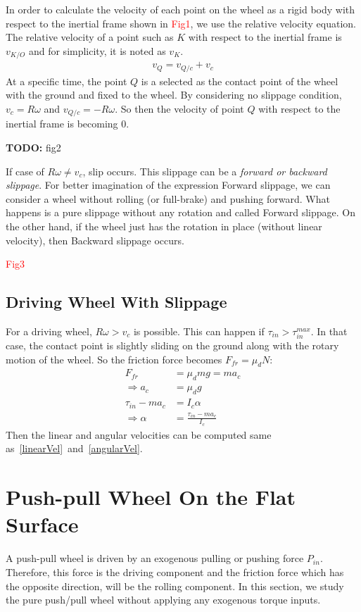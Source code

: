 \documentclass[letterpaper, 10pt, conference]{ieeeconf}
\newcommand{\TODO}[1]{{\color{red} {\bf TODO:} {#1}}}
\begin{document}
In order to calculate the velocity of each point on the wheel as a rigid body with respect to the inertial frame shown in \textcolor{red}{Fig1}, we use the relative velocity equation. The relative velocity of a point such as $K$ with respect to the inertial frame is $v_{K/O}$ and for simplicity, it is noted as $v_K$.
\begin{align}
v_Q = v_{Q/c} + v_c
\end{align}
At a specific time, the point $Q$ is a selected as the contact point of the wheel with the ground and fixed to the wheel. By considering no slippage condition, $v_c = R\omega$ and $v_{Q/c} = -R\omega$. So then the velocity of point $Q$ with respect to the inertial frame is becoming $0$.

\TODO{fig2}

If case of $R\omega \neq v_c$, slip occurs. This slippage can be a \emph{forward or backward slippage}. For better imagination of the expression Forward slippage, we can consider a wheel without rolling (or full-brake) and pushing forward. What happens is a pure slippage without any rotation and called Forward slippage. On the other hand, if the wheel just has the rotation in place (without linear velocity), then Backward slippage occurs.

\textcolor{red}{Fig3}
\subsection{Driving Wheel With Slippage}
For a driving wheel, $R\omega > v_c$ is possible. This can happen if $\tau_{in} > \tau_{in}^{max}$. In that case, the contact point is slightly sliding on the ground along with the rotary motion of the wheel. So the friction force becomes $F_{fr} = \mu_d N$:
\begin{align}
F_{fr} &= \mu_d mg = ma_c \\
\Rightarrow a_c &= \mu_dg \\
\tau_{in} - ma_c &= I_c \alpha \\
\Rightarrow \alpha &= \frac{\tau_{in} - ma_c}{I_c}
\end{align}
Then the linear and angular velocities can be computed same as~\eqref{linearVel}~and~\eqref{angularVel}.

\section{Push-pull Wheel On the Flat Surface}
A push-pull wheel is driven by an exogenous pulling or pushing force $P_{in}$. Therefore, this force is the driving component and the friction force which has the opposite direction, will be the rolling component. In this section, we study the pure push/pull wheel without applying any exogenous torque inputs.
\end{document}
